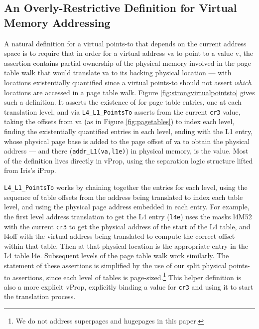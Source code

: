 \subsection{An Overly-Restrictive Definition for Virtual Memory Addressing}
\label{sec:overly-restrictive}
A natural definition for a virtual points-to that depends on the current address space is to
require that in order for a virtual address \textsf{va} to point to a value \textsf{v}, the assertion contains
partial ownership of the physical memory involved in the page table walk that would translate \textsf{va} to
its backing physical location --- with locations existentially quantified since a virtual points-to should not assert
\emph{which} locations are accessed in a page table walk.
Figure \ref{fig:strongvirtualpointsto} gives such a definition.
It asserts the existence of for page table entries, one at each translation level, and via \lstinline|L4_L1_PointsTo|
asserts from the current \lstinline|cr3| value, taking the offsets from \textsf{va} (as in Figure \ref{fig:pagetables})
to index each level, finding the existentially quantified entries in each level, 
ending with the L1 entry, whose physical page base is added to the page offset of \textsf{va} to obtain the physical address
 --- and there (\lstinline|addr_L1(va,l1e)|) in physical memory, is the value.
Most of the definition lives directly in \textsf{vProp}, using the separation logic structure lifted from Iris's \textsf{iProp}.

\lstinline|L4_L1_PointsTo| works by
chaining together the entries for each level, using the sequence of table offsets from the address being translated to index
each table level, and using the physical page address embedded in each entry.
For example, 
  the first level address translation to get the L4 entry (\lstinline|l4e|) 
  uses the masks \textsf{l4M52} with the current \lstinline|cr3| to get the 
  physical address of the start of the L4 table,
  and \textsf{l4off} with the virtual address being translated to compute the correct offset within that table.
  Then at that physical location is the appropriate entry in the L4 table \textsf{l4e}.
  Subsequent levels of the page table walk work similarly.
The statement of these assertions is simplified by the use of our split physical points-to assertions, since
each level of tables is page-sized.\footnote{We do not address superpages and hugepages in this paper.}
This helper definition is also a more explicit \textsf{vProp}, explicitly binding a value for \lstinline|cr3| and using it
to start the translation process.



